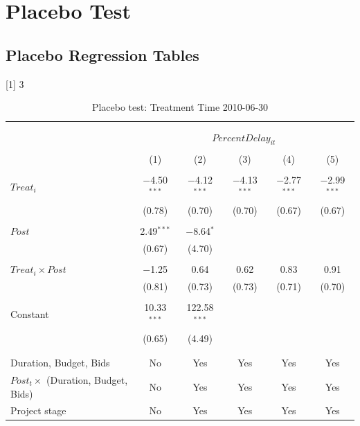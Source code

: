 \documentclass[
]{article}
\begin{document}
\hypertarget{placebo-test}{%
\section{Placebo Test}\label{placebo-test}}

\hypertarget{placebo-regression-tables}{%
\subsection{Placebo Regression Tables}\label{placebo-regression-tables}}

{[}1{]} 3

\begin{table}[H] \centering 
  \caption{Placebo test: Treatment Time 2010-06-30} 
  \label{} 
\small 
\begin{tabular}{@{\extracolsep{-2pt}}lccccc} 
\\[-1.8ex]\hline 
\hline \\[-1.8ex] 
\\[-1.8ex] & \multicolumn{5}{c}{$PercentDelay_{it}$} \\ 
\\[-1.8ex] & (1) & (2) & (3) & (4) & (5)\\ 
\hline \\[-1.8ex] 
 $Treat_i$ & $-$4.50$^{***}$ & $-$4.12$^{***}$ & $-$4.13$^{***}$ & $-$2.77$^{***}$ & $-$2.99$^{***}$ \\ 
  & (0.78) & (0.70) & (0.70) & (0.67) & (0.67) \\ 
  & & & & & \\ 
 $Post$ & 2.49$^{***}$ & $-$8.64$^{*}$ &  &  &  \\ 
  & (0.67) & (4.70) &  &  &  \\ 
  & & & & & \\ 
 $Treat_i \times Post$ & $-$1.25 & 0.64 & 0.62 & 0.83 & 0.91 \\ 
  & (0.81) & (0.73) & (0.73) & (0.71) & (0.70) \\ 
  & & & & & \\ 
 Constant & 10.33$^{***}$ & 122.58$^{***}$ &  &  &  \\ 
  & (0.65) & (4.49) &  &  &  \\ 
  & & & & & \\ 
\hline \\[-1.8ex] 
Duration, Budget, Bids & No & Yes & Yes & Yes & Yes \\ 
$Post_t \times$  (Duration, Budget, Bids) & No & Yes & Yes & Yes & Yes \\ 
Project stage & No & Yes & Yes & Yes & Yes \\ 

\end{tabular}
\end{table}
\end{document}
